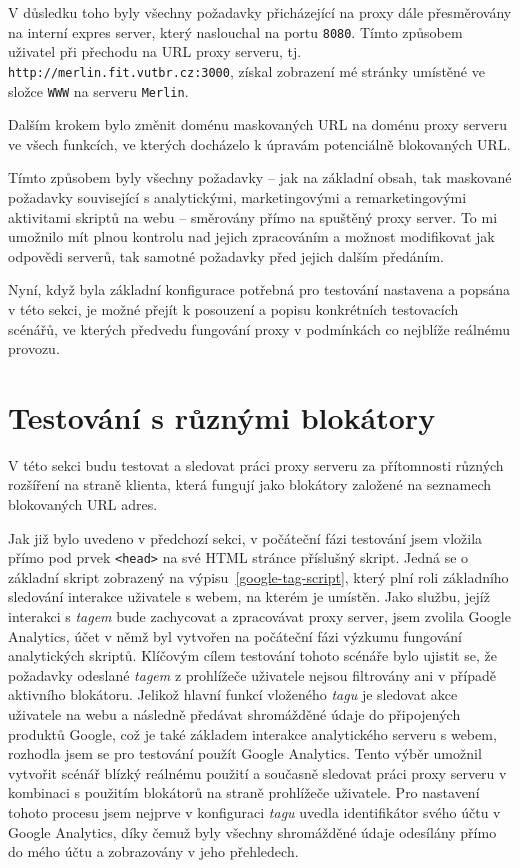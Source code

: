 V důsledku toho byly všechny požadavky přicházející na proxy dále přesměrovány na interní expres server, který naslouchal na portu \texttt{8080}. Tímto způsobem uživatel při přechodu na URL proxy serveru, tj. \texttt{http://merlin.fit.vutbr.cz:3000}, získal zobrazení mé stránky umístěné ve složce \texttt{WWW} na serveru \texttt{Merlin}.

Dalším krokem bylo změnit doménu maskovaných URL na doménu proxy serveru ve všech funkcích, ve kterých docházelo k úpravám potenciálně blokovaných URL.

Tímto způsobem byly všechny požadavky -- jak na základní obsah, tak maskované požadavky související s analytickými, marketingovými a remarketingovými aktivitami skriptů na webu -- směrovány přímo na spuštěný proxy server. To mi umožnilo mít plnou kontrolu nad jejich zpracováním a možnost modifikovat jak odpovědi serverů, tak samotné požadavky před jejich dalším předáním.

Nyní, když byla základní konfigurace potřebná pro testování nastavena a popsána v této sekci, je možné přejít k posouzení a popisu konkrétních testovacích scénářů, ve kterých předvedu fungování proxy v podmínkách co nejblíže reálnému provozu.

\section{Testování s různými blokátory}
\label{ch:6:testBlok}
V této sekci budu testovat a sledovat práci proxy serveru za přítomnosti různých rozšíření na straně klienta, která fungují jako blokátory založené na seznamech blokovaných URL adres. 

Jak již bylo uvedeno v předchozí sekci, v počáteční fázi testování jsem vložila přímo pod prvek \texttt{<head>} na své HTML stránce příslušný skript. Jedná se o základní skript zobrazený na výpisu~\ref{google-tag-script}, který plní roli základního sledování interakce uživatele s webem, na kterém je umístěn. Jako službu, jejíž interakci s {\it tagem} bude zachycovat a zpracovávat proxy server, jsem zvolila Google Analytics, účet v němž byl vytvořen na počáteční fázi výzkumu fungování analytických skriptů. Klíčovým cílem testování tohoto scénáře bylo ujistit se, že požadavky odeslané {\it tagem} z prohlížeče uživatele nejsou filtrovány ani v případě aktivního blokátoru. Jelikož hlavní funkcí vloženého {\it tagu} je sledovat akce uživatele na webu a následně předávat shromážděné údaje do připojených produktů Google, což je také základem interakce analytického serveru s webem, rozhodla jsem se pro testování použít Google Analytics. Tento výběr umožnil vytvořit scénář blízký reálnému použití a současně sledovat práci proxy serveru v kombinaci s použitím blokátorů na straně prohlížeče uživatele. Pro nastavení tohoto procesu jsem nejprve v konfiguraci {\it tagu} uvedla identifikátor svého účtu v Google Analytics, díky čemuž byly všechny shromážděné údaje odesílány přímo do mého účtu a zobrazovány v jeho přehledech.


